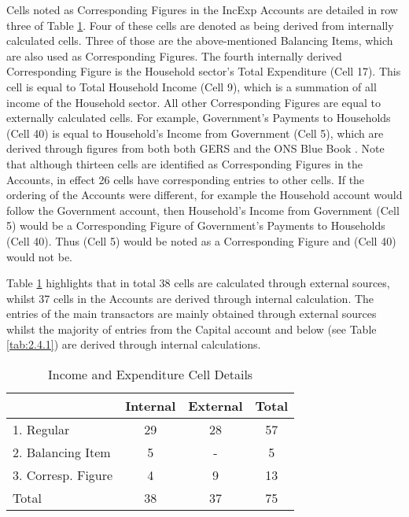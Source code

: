 \bigskip

Cells noted as Corresponding Figures in the IncExp Accounts are detailed in row three of Table \ref{tab:2.4.3}. Four of these cells are denoted as being derived from internally calculated cells. Three of those are the above-mentioned Balancing Items, which are also used as Corresponding Figures. The fourth internally derived Corresponding Figure is the Household sector's Total Expenditure (Cell 17). This cell is equal to Total Household Income (Cell 9), which is a summation of all income of the Household sector. All other Corresponding Figures are equal to externally calculated cells. For example, Government's Payments to Households (Cell 40) is equal to Household's Income from Government (Cell 5), which are derived through figures from both both GERS and the ONS Blue Book \cite{ScottishGovernment2013a, ONS2011c}. Note that although thirteen cells are identified as Corresponding Figures in the Accounts, in effect 26 cells have corresponding entries to other cells. If the ordering of the Accounts were different, for example the Household account would follow the Government account, then Household's Income from Government (Cell 5) would be a Corresponding Figure of Government's Payments to Households (Cell 40). Thus (Cell 5) would be noted as a Corresponding Figure and (Cell 40) would not be.

\bigskip

Table \ref{tab:2.4.3} highlights that in total 38 cells are calculated through external sources, whilst 37 cells in the Accounts are derived through internal calculation. The entries of the main transactors are mainly obtained through external sources whilst the majority of entries from the Capital account and below (see Table \ref{tab:2.4.1}) are derived through internal calculations.

\bigskip
\begin{centering}
  \begin{table}[H]
\centering
  \caption{Income and Expenditure Cell Details}
  \bigskip \begin{scriptsize}  \begin{doublespacing}
  \begin{tabular}{lccc}
  \toprule
  & Internal
  & External
  & Total  \bigstrut[b]\\
  \hline
  1. Regular &  29  & 28  &  57   \\
  2. Balancing Item &  5  &  -  &  5   \\
  3. Corresp. Figure &  4  &  9  &  13    \bigstrut[b]\\
  \hline
  Total &  38  &  37  &  75    \bigstrut[t]\\
      \bottomrule \end{tabular}%
      \bigskip  \label{tab:2.4.3}
      \end{doublespacing}  \end{scriptsize} \end{table}
      \end{centering}
\bigskip

